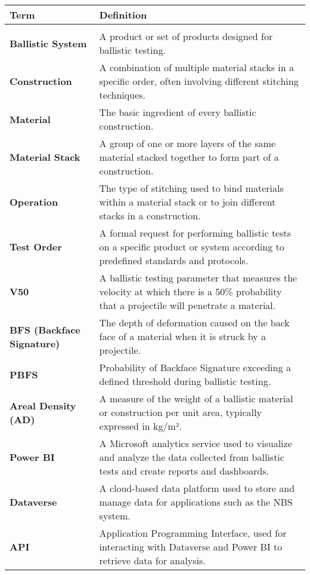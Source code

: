 \begin{small}
    \begin{longtable}{m{5cm} | m{9cm}}
        \textbf{Term} & \textbf{Definition} \\\hline\\
        \textbf{Ballistic System} & A product or set of products designed for ballistic testing. \\[2em]
        \textbf{Construction} & A combination of multiple material stacks in a specific order, often involving different stitching techniques. \\[2em]
        \textbf{Material} & The basic ingredient of every ballistic construction. \\[2em]
        \textbf{Material Stack} & A group of one or more layers of the same material stacked together to form part of a construction. \\[2em]
        \textbf{Operation} & The type of stitching used to bind materials within a material stack or to join different stacks in a construction. \\[2em]
        \textbf{Test Order} & A formal request for performing ballistic tests on a specific product or system according to predefined standards and protocols. \\[2em]
        \textbf{V50} & A ballistic testing parameter that measures the velocity at which there is a 50\% probability that a projectile will penetrate a material. \\[2em]
        \textbf{BFS (Backface Signature)} & The depth of deformation caused on the back face of a material when it is struck by a projectile. \\[2em]
        \textbf{PBFS} & Probability of Backface Signature exceeding a defined threshold during ballistic testing. \\[2em]
        \textbf{Areal Density (AD)} & A measure of the weight of a ballistic material or construction per unit area, typically expressed in kg/m². \\[2em]
        \textbf{Power BI} & A Microsoft analytics service used to visualize and analyze the data collected from ballistic tests and create reports and dashboards. \\[2em]
        \textbf{Dataverse} & A cloud-based data platform used to store and manage data for applications such as the NBS system. \\[2em]
        \textbf{API} & Application Programming Interface, used for interacting with Dataverse and Power BI to retrieve data for analysis. \\[2em]

\end{longtable}
\end{small}
